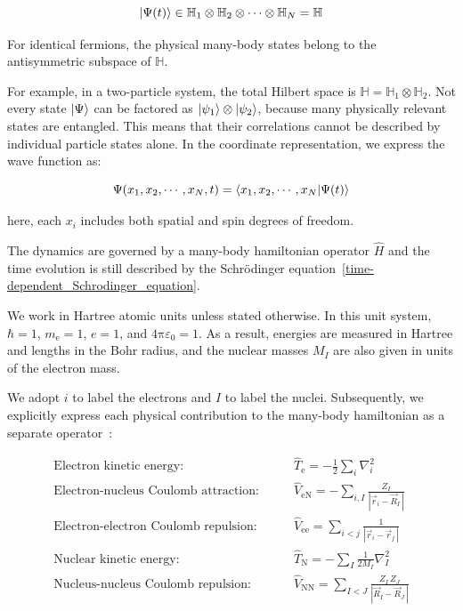 \begin{equation}
    \ket{\Psi(t)}\in \mathbb{H}_1\otimes\mathbb{H}_2\otimes \cdots\otimes\mathbb{H}_N=\mathbb{H}
\label{many-body_state_vector}
\end{equation}

For identical fermions, the physical many-body states belong to the antisymmetric subspace of $\mathbb{H}$.

For example, in a two-particle system, the total Hilbert space is $\mathbb{H}=\mathbb{H}_1\otimes\mathbb{H}_2$.
Not every state $\ket{\Psi}$ can be factored as  $\ket{\psi_1} \otimes \ket{\psi_2}$, because many physically relevant states are entangled.
This means that their correlations cannot be described by individual particle states alone. In the coordinate representation, we express the wave function as:

\begin{equation}
    \Psi(x_1,x_2,\cdots,x_N,t)=\braket{x_1,x_2,\cdots,x_N|\Psi(t)}
\label{many-body_wave_function}
\end{equation}

here, each $x_i$ includes both spatial and spin degrees of freedom.

The dynamics are governed by a many-body hamiltonian operator $\hat{H}$ and the time evolution is still described by the Schrödinger equation~\eqref{time-dependent_Schrodinger_equation}.

We work in Hartree atomic units unless stated otherwise.
In this unit system, $\hbar=1$, $m_\mathrm{e}=1$, $e=1$, and $4\mathrm{\pi}\varepsilon_0=1$.
As a result, energies are measured in Hartree and lengths in the Bohr radius, and the nuclear masses $M_I$ are also given in units of the electron mass.

We adopt $i$ to label the electrons and $I$ to label the nuclei.
Subsequently, we explicitly express each physical contribution to the many-body hamiltonian as a separate operator~\cite{sholl2022density}:

\begin{align}
\text{Electron kinetic energy:}\qquad & \hat{T}_\mathrm{e} = -\frac{1}{2}\sum_i\nabla_i^2
\label{electrons_kinetic} \\
\text{Electron-nucleus Coulomb attraction:}\qquad & \hat{V}_\mathrm{eN}=-\sum_{i,I}\frac{Z_I}{|\vec{r}_i-\vec{R}_I\,|}
\label{electrons_nucleus_Coulomb} \\
\text{Electron-electron Coulomb repulsion:}\qquad & \hat{V}_\mathrm{ee}=\sum_{i<j}\frac{1}{|\vec{r}_i-\vec{r}_j\,|}
\label{electrons_Coulomb} \\
\text{Nuclear kinetic energy:}\qquad & \hat{T}_\mathrm{N} = -\sum_I\frac{1}{2M_I}\nabla_I^2
\label{nucleus_kinetic} \\
\text{Nucleus-nucleus Coulomb repulsion:}\qquad & \hat{V}_\mathrm{NN} = \sum_{I<J}\frac{Z_I\,Z_J}{|\vec{R}_I-\vec{R}_J\,|}
\label{nucleus_interaction}
\end{align}

